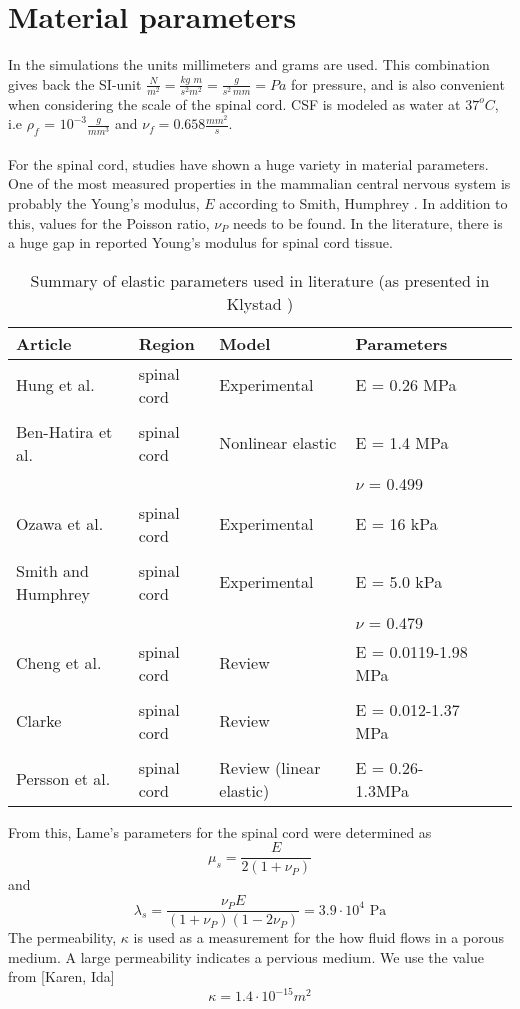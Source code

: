 \chapter{Material parameters}
In the simulations the units millimeters and grams are used. This combination gives back the SI-unit $\frac{N}{m^2} = \frac{kg\,\,m}{s^2 m^2} = \frac{g}{s^2\,mm} = Pa$ for pressure, and is also convenient when considering the scale of the spinal cord. CSF is modeled as water at $37^o C$, i.e $\rho_f$ = $10^{-3} \frac{g}{mm^3}$ and $\nu_f = 0.658 \frac{mm^2}{s}$.
\\
\\
For the spinal cord, studies have shown a huge variety in material parameters. One of the most measured properties in the mammalian central nervous system is probably the Young's modulus, $E$ according to Smith, Humphrey \cite{Smit07}. In addition to this, values for the Poisson ratio, $\nu_P$ needs to be found. In the literature, there is a huge gap in reported Young's modulus for spinal cord tissue. 


\begin{table}[!ht]
  \begin{center}
  \begin{tabular}{l  l  l  l  l  l}
	\hline
    Article & Region &  Model & Parameters \\ \hline
	Hung et al. \cite{Hung81} & spinal cord & Experimental & E = 0.26 MPa  \\ \\
	Ben-Hatira et al. \cite{Ben12} & spinal cord & Nonlinear elastic & E  = 1.4 MPa \\
	& & &  $\nu $  = 0.499 \\
	Ozawa et al. \cite{Ozaw04} & spinal cord & Experimental & E = 16 kPa \\ \\
	Smith and Humphrey \cite{Smit07} & spinal cord & Experimental & E = 5.0 kPa \\
	& & &  $\nu$ = 0.479 \\
	Cheng et al. \cite{Chen08} & spinal cord & Review & E = 0.0119-1.98 MPa \\ \\
	Clarke \cite{Clar10} & spinal cord & Review & E = 0.012-1.37 MPa \\ \\
	Persson et al. \cite{Pers10} & spinal cord & Review (linear elastic) & E = 0.26-1.3MPa \\ 
    \hline 
  \end{tabular}
  \caption{Summary of elastic parameters used in literature (as presented in Klystad \cite{Kyls14})}
  \end{center}
\end{table}



From this, Lame's parameters for the spinal cord were determined as
\[ \mu_s = \frac{E}{2(1 + \nu_P)} \] and
\[ \lambda_s = \frac{\nu_P E}{(1 + \nu_P)(1-2\nu_P)} = 3.9 \cdot 10^4 \text{ Pa} \]
The permeability, $\kappa$ is used as a measurement for the how fluid flows in a porous medium. A large permeability indicates a pervious medium. We use the value from [Karen, Ida]
\[ \kappa = 1.4\cdot 10^{-15} m^2 \]
